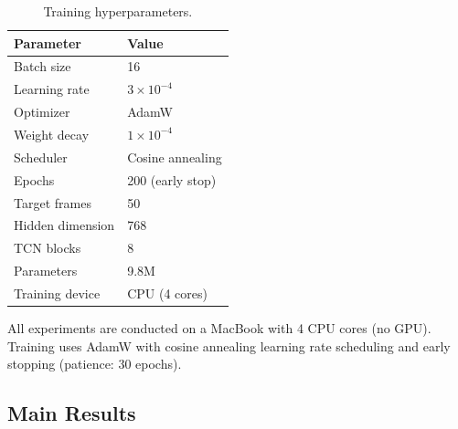 \documentclass[conference]{IEEEtran}
\begin{document}
\begin{table}[htbp]
\centering
\caption{Training hyperparameters.}
\label{tab:hyperparams}
\begin{tabular}{ll}
\toprule
\textbf{Parameter} & \textbf{Value} \\
\midrule
Batch size & 16 \\
Learning rate & $3 \times 10^{-4}$ \\
Optimizer & AdamW \\
Weight decay & $1 \times 10^{-4}$ \\
Scheduler & Cosine annealing \\
Epochs & 200 (early stop) \\
Target frames & 50 \\
Hidden dimension & 768 \\
TCN blocks & 8 \\
Parameters & 9.8M \\
Training device & CPU (4 cores) \\
\bottomrule
\end{tabular}
\end{table}

All experiments are conducted on a MacBook with 4 CPU cores (no GPU). Training uses AdamW with cosine annealing learning rate scheduling and early stopping (patience: 30 epochs).

\subsection{Main Results}
\end{document}
